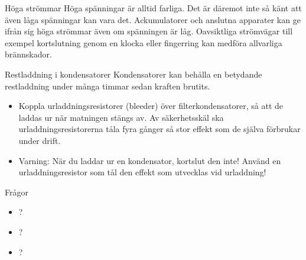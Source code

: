 \documentclass{beamer}
\begin{document}
\begin{frame}{Höga strömmar}
Höga spänningar är alltid farliga.
Det är däremot inte så känt att även låga spänningar kan vara det.
Ackumulatorer och anslutna apparater kan ge ifrån sig höga strömmar även om
spänningen är låg.
Oavsiktliga strömvägar till exempel kortslutning genom en klocka eller
fingerring kan medföra allvarliga brännskador.
\end{frame}

\begin{frame}{Restladdning i kondensatorer}
Kondensatorer kan behålla en betydande restladdning under många timmar
sedan kraften brutits.

\begin{itemize}
	\item Koppla urladdningsresistorer (bleeder) över filterkondensatorer,
	så att de laddas ur när matningen stängs av.
	Av säkerhetsskäl ska urladdningsresistorerna tåla fyra gånger så stor effekt
	som de själva förbrukar under drift.
	\item Varning: När du laddar ur en kondensator, kortslut den inte!
	Använd en urladdningsresistor som tål den effekt som utvecklas vid urladdning!
\end{itemize}
\end{frame}

\begin{frame}{Frågor}

	\begin{itemize}
		\item ?
		\item ?
		\item ?
	\end{itemize}
\end{frame}
\end{document}
